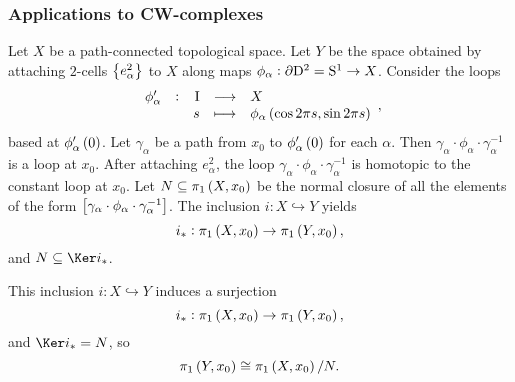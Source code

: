 \subsubsection{Applications to CW-complexes}

Let $ X $ be a path-connected topological space. Let $ Y $ be the space obtained by attaching $ 2 $-cells $ \cbr{e_\alpha^2} $ to $ X $ along maps $ \phi_\alpha : \partial \mathrm{D}^2 = \mathrm{S}^1 \to X $. Consider the loops
$$ \function[\phi_\alpha']{\I}{X}{s}{\phi_\alpha\br{\cos 2\pi s, \sin 2\pi s}}, $$
based at $ \phi_\alpha'\br{0} $. Let $ \gamma_\alpha $ be a path from $ x_0 $ to $ \phi_\alpha'\br{0} $ for each $ \alpha $. Then $ \gamma_\alpha \cdot \phi_\alpha \cdot \gamma_\alpha^{-1} $ is a loop at $ x_0 $. After attaching $ e_\alpha^2 $, the loop $ \gamma_\alpha \cdot \phi_\alpha \cdot \gamma_\alpha^{-1} $ is homotopic to the constant loop at $ x_0 $. Let $ N \subseteq \pi_1\br{X, x_0} $ be the normal closure of all the elements of the form $ \sbr{\gamma_\alpha \cdot \phi_\alpha \cdot \gamma_\alpha^{-1}} $. The inclusion $ i : X \hookrightarrow Y $ yields
$$ i_* : \pi_1\br{X, x_0} \to \pi_1\br{Y, x_0}, $$
and $ N \subseteq \Ker i_* $.

\begin{proposition}
\label{prop:1.26}
This inclusion $ i : X \hookrightarrow Y $ induces a surjection
$$ i_* : \pi_1\br{X, x_0} \to \pi_1\br{Y, x_0}, $$
and $ \Ker i_* = N $, so
$$ \pi_1\br{Y, x_0} \cong \pi_1\br{X, x_0} / N. $$
\end{proposition}

